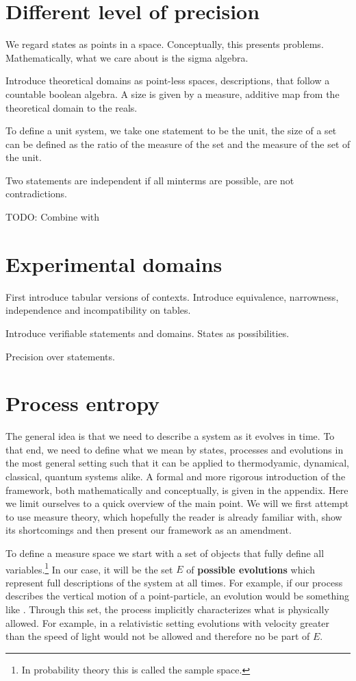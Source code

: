 \documentclass[letterpaper]{article}
\begin{document}
\section{Different level of precision}



We regard states as points in a space. Conceptually, this presents problems. Mathematically, what we care about is the sigma algebra.

Introduce theoretical domains as point-less spaces, descriptions, that follow a countable boolean algebra. A size is given by a measure, additive map from the theoretical domain to the reals.

To define a unit system, we take one statement to be the unit, the size of a set can be defined as the ratio of the measure of the set and the measure of the set of the unit.

Two statements are independent if all minterms are possible, are not contradictions.

TODO: Combine with

\section{Experimental domains}

First introduce tabular versions of contexts. Introduce equivalence, narrowness, independence and incompatibility on tables.

Introduce verifiable statements and domains. States as possibilities.

Precision over statements.


\section{Process entropy}

The general idea is that we need to describe a system as it evolves in time. To that end, we need to define what we mean by states, processes and evolutions in the most general setting such that it can be applied to thermodyamic, dynamical, classical, quantum systems alike. A formal and more rigorous introduction of the framework, both mathematically and conceptually, is given in the appendix. Here we limit ourselves to a quick overview of the main point. We will we first attempt to use measure theory, which hopefully the reader is already familiar with, show its shortcomings and then present our framework as an amendment.

To define a measure space we start with a set of objects that fully define all variables.\footnote{In probability theory this is called the sample space.} In our case, it will be the set $E$ of \textbf{possible evolutions} which represent full descriptions of the system at all times. For example, if our process describes the vertical motion of a point-particle, an evolution would be something like . Through this set, the process implicitly characterizes what is physically allowed. For example, in a relativistic setting evolutions with velocity greater than the speed of light would not be allowed and therefore no be part of $E$.
\end{document}
